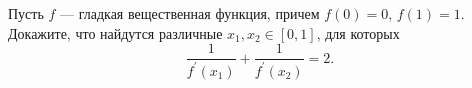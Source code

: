 \documentclass{article}
\begin{document}
Пусть $f$ --- гладкая вещественная функция, причем $f(0) = 0$, $f(1) = 1$. Докажите, что найдутся различные $x_1, x_2 \in [0,1]$, для которых
$$\frac{1}{f^{'}(x_1)} + \frac{1}{f^{'}(x_2)} = 2.$$
\end{document}
